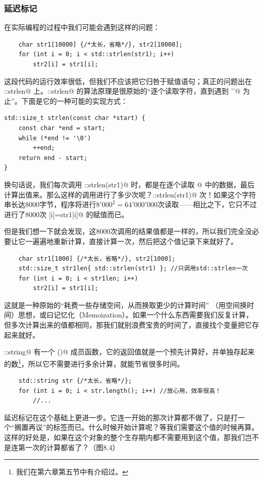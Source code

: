 \subsubsection*{延迟标记}
在实际编程的过程中我们可能会遇到这样的问题：
\begin{lstlisting}
    char str1[10000] {/*太长，省略*/}, str2[10000];
    for (int i = 0; i < std::strlen(str1); i++)
        str2[i] = str1[i];
\end{lstlisting}
这段代码的运行效率很低，但我们不应该把它归咎于赋值语句；真正的问题出在 \lstinline@std::strlen@ 上。\lstinline@std::strlen@ 的算法原理是很原始的``逐个读取字符，直到遇到 \lstinline@'\0'@ 为止''。下面是它的一种可能的实现方式：
\begin{lstlisting}
std::size_t strlen(const char *start) {
    const char *end = start;
    while (*end != '\0')
        ++end;
    return end - start;
}
\end{lstlisting}
换句话说，我们每次调用 \lstinline@std::strlen(str1)@ 时，都是在逐个读取 @ 中的数据，最后计算出值来。那么这样的调用进行了多少次呢？\lstinline@std::strlen(str1)@ 次！如果这个字符串长达8000字节，程序将进行$8'000^2=64'000'000$次读取——相比之下，它只不过进行了8000次 [i]=str1[i]@ 的赋值而已。\par
但是我们想一下就会发现，这8000次调用的结果值都是一样的，所以我们完全没必要让它一遍遍地重新计算，直接计算一次，然后把这个值记录下来就好了。
\begin{lstlisting}
    char str1[1000] {/*太长，省略*/}, str2[1000];
    std::size_t str1len{ std::strlen(str1) }; //只调用std::strlen一次
    for (int i = 0; i < str1len; i++)
        str2[i] = str1[i];
\end{lstlisting}
这就是一种原始的``耗费一些存储空间，从而换取更少的计算时间'' （用空间换时间）思想，或曰记忆化（Memoization）。如果一个什么东西需要我们反复计算，但多次计算出来的值都相同，那我们就别浪费宝贵的时间了，直接找个变量把它存起来就好。\par
\lstinline@std::string@ 有一个 \lstinline@length()@ 成员函数，它的返回值就是一个预先计算好，并单独存起来的数\footnote{我们在第六章第五节中有介绍过。}，所以它不需要进行多余计算，就能节省很多时间。
\begin{lstlisting}
    std::string str {/*太长，省略*/};
    for (int i = 0; i < str.length(); i++) //放心用，效率很高！
        //...
\end{lstlisting}\par
延迟标记在这个基础上更进一步。它连一开始的那次计算都不做了，只是打一个``搁置再议''的标签而已。什么时候开始计算呢？等我们需要这个值的时候再算。这样的好处是，如果在这个对象的整个生存期内都不需要用到这个值，那我们岂不是连第一次的计算都省了？（图8.4）\par
